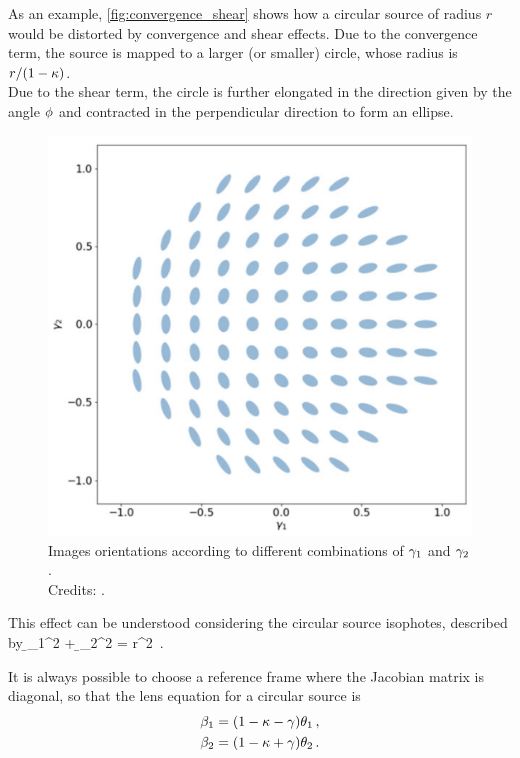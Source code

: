 As an example, \cref{fig:convergence_shear} shows how a circular source of radius $r$ would be distorted by convergence and shear effects. Due to the convergence term, the source is mapped to a larger (or smaller) circle, whose radius is $r / (1 - \kappa)$.\\Due to the shear term, the circle is further elongated in the direction given by the angle $\phi$ and contracted in the perpendicular direction to form an ellipse. 

\begin{figure}
    \centering
    \includegraphics[width=0.7\linewidth]{img//chapter2/shear_orientations.png}
    \caption[Images orientations according to different combinations of $\g_1$ and $\g_2$]{Images orientations according to different combinations of $\g_1$ and $\g_2$.\\\small{Credits: \cite{meneghetti_introduction_2021}}.}
    \label{fig:shear_orient}
\end{figure}

This effect can be understood considering the circular source isophotes, described by
\be
\label{eq:source_isoph}
\b_1^2 + \b_2^2 = r^2 \,.
\ee

It is always possible to choose a reference frame where the Jacobian matrix is diagonal, so that the lens equation for a circular source is
\begin{subequations}
\begin{align}
    \label{eq:circu_lens1}
    \beta_1 = (1 - \kappa - \gamma) \theta_1 \,,
    \\
    \label{eq:circu_lens2}
    \beta_2 = (1 - \kappa + \gamma) \theta_2 \,.
\end{align}
\end{subequations}

